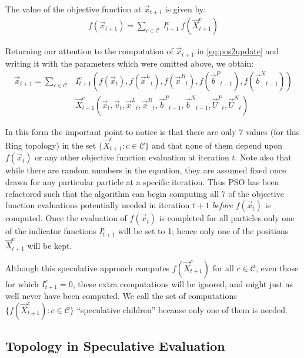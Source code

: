 \documentclass[smallcondensed]{svjour3}
\providecommand{\pers}{\ensuremath{P}}
\providecommand{\neigh}{\ensuremath{N}}
\providecommand{\leftind}{\ensuremath{L}}
\providecommand{\rightind}{\ensuremath{R}}
\providecommand{\nURand}{\ensuremath{\Vec{U}^\neigh}}
\providecommand{\pURand}{\ensuremath{\Vec{U}^\pers}}
\providecommand{\ppos}{\ensuremath{\Vec{x}}}
\providecommand{\pvel}{\ensuremath{\Vec{v}}}
\providecommand{\nbest}{\ensuremath{\Vec{b}^\neigh}}
\providecommand{\pbest}{\ensuremath{\Vec{b}^\pers}}
\providecommand{\ofunc}{\ensuremath{f}}
\providecommand{\indic}{\ensuremath{I}}
\providecommand{\specpos}{\ensuremath{\Vec{X}}}
\providecommand{\leftn}{\ensuremath{\Vec{x}^\leftind}}
\providecommand{\rightn}{\ensuremath{\Vec{x}^\rightind}}
\providecommand{\caseset}{\ensuremath{\mathcal{C}}}
\providecommand{\casegen}{\ensuremath{c}}
\begin{document}
The value of the objective function at $\ppos_{t+1}$ is given by:
\begin{align}
\label{eq:val2update}
	\ofunc (\ppos_{t+1}) = \sum_{c \in \caseset} \ \indic_{t+1}^{c}
	\ \ofunc(\specpos_{t+1}^{c})
\end{align}

Returning our attention to the computation of $\ppos_{t+1}$ in
\eqref{eq:pos2update} and writing it with the parameters which were omitted
above, we obtain:
\begin{align}
\nonumber
  \ppos_{t+1} = \sum_{c \in \caseset}
	&\indic_{t+1}^{c}(\ofunc ( \ppos_{t} ) ,\ofunc(\leftn_{t}),
	\ofunc(\rightn_{t}) ,\ofunc(\pbest_{t-1}) ,\ofunc(\nbest_{t-1})) \\
\label{eq:val2updatelong}
	& \specpos_{t+1}^{c}(\ppos_{t},\pvel_{t},\leftn_{t},\rightn_{t},
	\pbest_{t-1},\nbest_{t-1},\pURand_{t}, \nURand_{t})
\end{align}

In this form the important point to notice is that there are only $7$ values
(for this Ring topology) in the set $\{\specpos_{t+1}^{\casegen}: \casegen \in
\caseset\}$ and that none of them depend upon $f(\ppos_t)$ or any other
objective function evaluation at iteration $t$.  Note also that while there are
random numbers in the equation, they are assumed fixed once drawn for any
particular particle at a specific iteration.  Thus PSO has been refactored such
that the algorithm can begin computing all $7$ of the objective function
evaluations potentially needed in iteration $t+1$ \emph{before} $f(\ppos_t)$ is
computed.  Once the evaluation of $f(\ppos_{t})$ is completed for all particles
only one of the indicator functions $\indic_{t+1}^{\casegen}$ will be set to 1;
hence only one of the positions $\specpos_{t+1}^\casegen$ will be kept.

Although this speculative approach computes $\ofunc(\specpos_{t+1}^{\casegen})$
for all $\casegen \in \caseset$, even those for which $\indic_{t+1}^{\casegen}
= 0$, these extra computations will be ignored, and might just as well never
have been computed.  We call the set of computations
$\{\ofunc(\specpos_{t+1}^{c}) : \casegen \in \caseset\}$ ``speculative
children'' because only one of them is needed.

\subsection{Topology in Speculative Evaluation}
\label{sec:topology}
\end{document}
